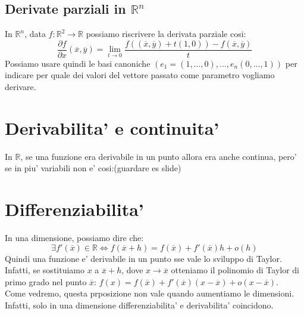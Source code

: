 \documentclass{report}
\begin{document}
\subsection{Derivate parziali in $ \mathbb{R}^n $}
In $ \mathbb{R}^n $, data $ f:\mathbb{R}^2\to\mathbb{R} $ possiamo riscrivere la derivata parziale cosi:
\[
  \frac{\partial f}{\partial x}(\overline{x}, \overline{y}) = \lim_{t\to 0}\frac{f((\overline{x}, \overline{y}) +t(1,0))- f(\overline{x}, \overline{y})}{t}
\]
Possiamo usare quindi le basi canoniche $ (e_1 = (1,...,0),...,e_n(0,...,1)) $ per indicare per quale dei valori del vettore passato come parametro vogliamo derivare.

\section{Derivabilita' e continuita'}
In $ \mathbb{R} $, se una funzione era derivabile in un punto allora era anche continua, pero' se in piu' variabili non e' cosi:(guardare es slide)

\section{Differenziabilita'}
In una dimensione, possiamo dire che:
\[
  \exists f'(\overline{x}) \in \mathbb{R} \iff f(\overline{x}+h) = f(\overline{x}) + f'(\overline{x})h + o(h)   
\]
Quindi una funzione e' derivabile in un punto sse vale lo sviluppo di Taylor. Infatti, se sostituiamo $ x $ a $ \overline{x} + h $, dove $ x\to \overline{x} $ otteniamo il polinomio di Taylor di primo grado nel punto $ \overline{x} $: $ f(x) = f(\overline{x}) + f'(\overline{x})(x - \overline{x}) + o(x - \overline{x}) $.\\
Come vedremo, questa prposizione non vale quando aumentiamo le dimensioni. Infatti, solo in una dimensione differenziabilita' e derivabilita' coincidono.
\end{document}
